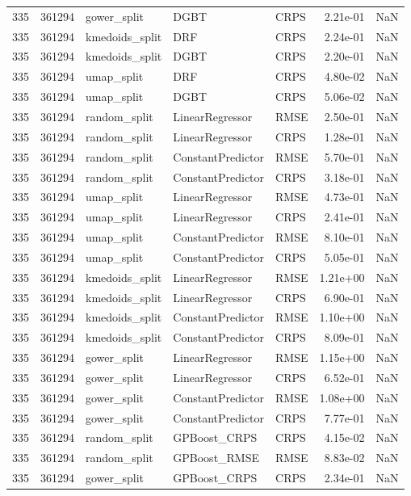 \begin{tabular}{rrlllrr}
335 & 361294 & gower\_split & DGBT & CRPS & 2.21e-01 & NaN \\
335 & 361294 & kmedoids\_split & DRF & CRPS & 2.24e-01 & NaN \\
335 & 361294 & kmedoids\_split & DGBT & CRPS & 2.20e-01 & NaN \\
335 & 361294 & umap\_split & DRF & CRPS & 4.80e-02 & NaN \\
335 & 361294 & umap\_split & DGBT & CRPS & 5.06e-02 & NaN \\
335 & 361294 & random\_split & LinearRegressor & RMSE & 2.50e-01 & NaN \\
335 & 361294 & random\_split & LinearRegressor & CRPS & 1.28e-01 & NaN \\
335 & 361294 & random\_split & ConstantPredictor & RMSE & 5.70e-01 & NaN \\
335 & 361294 & random\_split & ConstantPredictor & CRPS & 3.18e-01 & NaN \\
335 & 361294 & umap\_split & LinearRegressor & RMSE & 4.73e-01 & NaN \\
335 & 361294 & umap\_split & LinearRegressor & CRPS & 2.41e-01 & NaN \\
335 & 361294 & umap\_split & ConstantPredictor & RMSE & 8.10e-01 & NaN \\
335 & 361294 & umap\_split & ConstantPredictor & CRPS & 5.05e-01 & NaN \\
335 & 361294 & kmedoids\_split & LinearRegressor & RMSE & 1.21e+00 & NaN \\
335 & 361294 & kmedoids\_split & LinearRegressor & CRPS & 6.90e-01 & NaN \\
335 & 361294 & kmedoids\_split & ConstantPredictor & RMSE & 1.10e+00 & NaN \\
335 & 361294 & kmedoids\_split & ConstantPredictor & CRPS & 8.09e-01 & NaN \\
335 & 361294 & gower\_split & LinearRegressor & RMSE & 1.15e+00 & NaN \\
335 & 361294 & gower\_split & LinearRegressor & CRPS & 6.52e-01 & NaN \\
335 & 361294 & gower\_split & ConstantPredictor & RMSE & 1.08e+00 & NaN \\
335 & 361294 & gower\_split & ConstantPredictor & CRPS & 7.77e-01 & NaN \\
335 & 361294 & random\_split & GPBoost\_CRPS & CRPS & 4.15e-02 & NaN \\
335 & 361294 & random\_split & GPBoost\_RMSE & RMSE & 8.83e-02 & NaN \\
335 & 361294 & gower\_split & GPBoost\_CRPS & CRPS & 2.34e-01 & NaN \\

\end{tabular}
